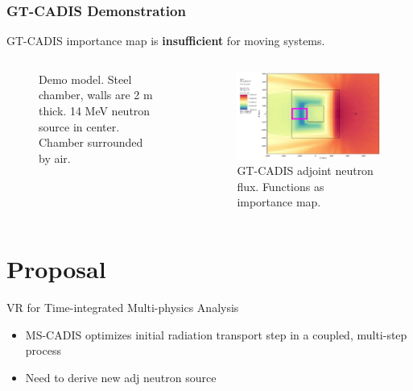 \documentclass{beamer}
\begin{document}
\begin{frame}
\frametitle{GT-CADIS Demonstration}
	GT-CADIS importance map is \textbf{insufficient} for moving systems.

	\begin{columns}
        \begin{figure}
	\vspace{0.8cm}
		\hspace{-1cm}
		\vspace{-0.3cm}
	\caption{Demo model. Steel chamber, walls are 2 m thick.  14 MeV
		neutron source in center.  Chamber surrounded by air.}
        \end{figure}

        \begin{figure}
	\centering
	\includegraphics[scale=0.20]{gtcadis_adjn_hi.jpg}
		\caption{GT-CADIS adjoint neutron flux. Functions as importance
		map.}
	\end{figure}
	\end{columns}

\end{frame}


\section{Proposal}

\begin{frame}{VR for Time-integrated Multi-physics Analysis}
	\begin{itemize}
		\item{MS-CADIS optimizes initial radiation transport step in a coupled, multi-step
			process}
		\item{Need to derive new adj neutron source}
	\end{itemize}

\end{frame}
\end{document}
